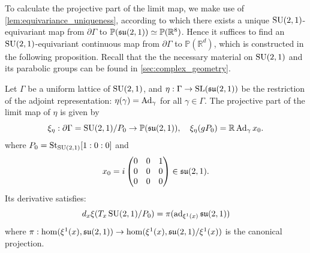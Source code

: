 \documentclass{report}
\begin{document}
To calculate the projective part of the limit map, we make use of \cref{lem:equivariance_uniqueness}, according to which there exists a unique $\operatorname{{\mathrm{SU}}}(2,1)$-equivariant map from $\partial \Gamma$ to $\mathbb P (\operatorname{{\mathfrak{su}}}(2,1)) \simeq \mathbb P(\mathbb R^8)$.
Hence it suffices to find an $\operatorname{{\mathrm{SU}}}(2,1)$-equivariant continuous map from $\partial \Gamma$ to $\mathbb P(\mathbb R^d)$, which is constructed in the following proposition.
Recall that the the necessary material on $\operatorname{{\mathrm{SU}}}(2,1)$ and its parabolic groups can be found in \cref{sec:complex_geometry}.
\begin{proposition}\label{prop:counterexample_limit_map}
    Let $\Gamma$ be a uniform lattice of $\operatorname{{\mathrm{SU}}}(2,1)$, and $\eta: \Gamma \to \operatorname{{\mathrm{SL}}}(\mathfrak{su}(2,1))$ be the restriction of the adjoint representation: $\eta(\gamma) = \operatorname{Ad}_{\gamma}$ for all $\gamma \in \Gamma$.
    The projective part of the limit map of $\eta$ is given by
    \[
        \xi_\eta: \partial \Gamma = \operatorname{{\mathrm{SU}}}(2,1)/P_0 \to \mathbb P(\mathfrak{su}(2,1)), \quad \xi_\eta(g P_0) = \mathbb R \operatorname{Ad}_{\gamma} x_0.
    \]
    where  $P_0 = \mathrm{St}_{\operatorname{{\mathrm{SU}}}(2,1)} [1:0:0]$ and 
    \[
    x_0 = i \begin{pmatrix} 0 & 0 & 1 \\ 0 & 0 & 0 \\ 0 & 0 & 0 \end{pmatrix} \in \operatorname{{\mathfrak{su}}}(2,1).
    \]
    Its derivative satisfies: 
    \[
    d_x \xi(T_x \operatorname{{\mathrm{SU}}}(2,1)/P_0) = \pi(\operatorname{ad}_{\xi^1(x)} \operatorname{{\mathfrak{su}}}(2,1))
    \]
    where $\pi : \hom (\xi^1(x), \operatorname{{\mathfrak{su}}}(2,1)) \to \hom(\xi^1(x), \operatorname{{\mathfrak{su}}}(2,1)/ \xi^1(x))$ is the canonical projection.
\end{proposition}
\end{document}
